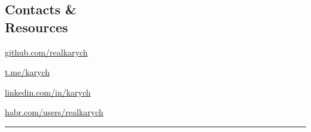 \documentclass[a4paper,11pt]{article}
\newcommand{\MyVerticalRule}{%
	\textcolor{ColorOne}{\rule{1pt}{\textheight}}
}
\newcommand{\myhref}[2]{%
\href{#1}{\textcolor{ColorTwo}{#2}}
}
\begin{document}
\begin{adjustbox}{valign=t}
\begin{minipage}{0.3\textwidth}
\begin{flushleft}
\section*{Contacts \& \\ Resources}
\begin{description}[font=\normalfont\color{ColorOne},leftmargin=0pt,labelwidth=0pt]
    \item[\faGithub] \myhref{https://github.com/realkarych}{github.com/realkarych}
    \vspace{-0.5em}
    \item[\faTelegram] \myhref{https://t.me/karych}{t.me/karych}
    \vspace{-0.5em}
    \item[\faLinkedin] \myhref{https://www.linkedin.com/in/karych}{linkedin.com/in/karych
    \vspace{-0.5em}}
    \item[\faLink] \myhref{https://habr.com/ru/users/realkarych/}{habr.com/users/realkarych}
\end{description}
\end{flushleft}

\vfill
\end{minipage}
\end{adjustbox}
\hfill
\begin{adjustbox}{valign=t}
\begin{minipage}{0.02\textwidth}
\MyVerticalRule
\end{minipage}
\end{adjustbox}
\hfill
\end{document}
